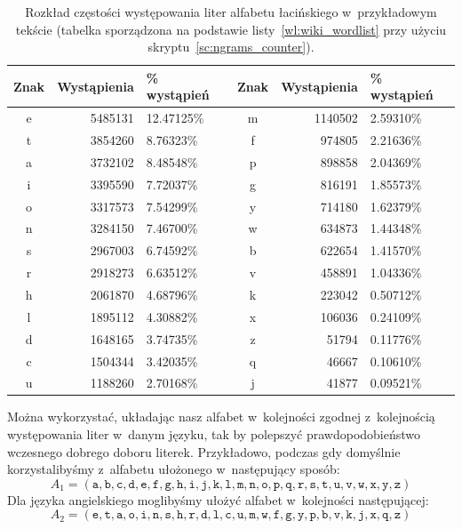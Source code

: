 \documentclass[12pt,a4paper,twoside]{article}
\begin{document}
\begin{table}[htb]
    \caption{Rozkład częstości występowania liter alfabetu łacińskiego
    w~przykładowym tekście (tabelka sporządzona na podstawie
    listy~\ref{wl:wiki_wordlist} przy użyciu skryptu~\ref{sc:ngrams_counter}).}
    \label{tbl:english_letter_frequencies}
    \begin{tabular}{|c|r|l||c|r|l|}
        \hline
        Znak & \small Wystąpienia & \small \% wystąpień &
        Znak & \small Wystąpienia & \small \% wystąpień \\
        \hline
        e & 5485131 & 12.47125\% & m & 1140502 & 2.59310\% \\
        t & 3854260 &  8.76323\% & f &  974805 & 2.21636\% \\
        a & 3732102 &  8.48548\% & p &  898858 & 2.04369\% \\
        i & 3395590 &  7.72037\% & g &  816191 & 1.85573\% \\
        o & 3317573 &  7.54299\% & y &  714180 & 1.62379\% \\
        n & 3284150 &  7.46700\% & w &  634873 & 1.44348\% \\
        s & 2967003 &  6.74592\% & b &  622654 & 1.41570\% \\
        r & 2918273 &  6.63512\% & v &  458891 & 1.04336\% \\
        h & 2061870 &  4.68796\% & k &  223042 & 0.50712\% \\
        l & 1895112 &  4.30882\% & x &  106036 & 0.24109\% \\
        d & 1648165 &  3.74735\% & z &   51794 & 0.11776\% \\
        c & 1504344 &  3.42035\% & q &   46667 & 0.10610\% \\
        u & 1188260 &  2.70168\% & j &   41877 & 0.09521\% \\
        \hline
    \end{tabular}
\end{table}

Można wykorzystać, układając nasz alfabet w~kolejności zgodnej z~kolejnością
występowania liter w~danym języku, tak by polepszyć prawdopodobieństwo
wczesnego dobrego doboru literek. Przykładowo, podczas gdy domyślnie
korzystalibyśmy z~alfabetu ułożonego w~następujący sposób:
    $$A_1 = (
    \mathtt{a}, \mathtt{b}, \mathtt{c}, \mathtt{d}, \mathtt{e}, \mathtt{f},
    \mathtt{g}, \mathtt{h}, \mathtt{i}, \mathtt{j}, \mathtt{k}, \mathtt{l},
    \mathtt{m}, \mathtt{n}, \mathtt{o}, \mathtt{p}, \mathtt{q}, \mathtt{r},
    \mathtt{s}, \mathtt{t}, \mathtt{u}, \mathtt{v}, \mathtt{w}, \mathtt{x},
    \mathtt{y}, \mathtt{z})$$
Dla języka angielskiego moglibyśmy ułożyć alfabet w~kolejności następującej:
    $$A_2 = (
    \mathtt{e}, \mathtt{t}, \mathtt{a}, \mathtt{o}, \mathtt{i}, \mathtt{n},
    \mathtt{s}, \mathtt{h}, \mathtt{r}, \mathtt{d}, \mathtt{l}, \mathtt{c},
    \mathtt{u}, \mathtt{m}, \mathtt{w}, \mathtt{f}, \mathtt{g}, \mathtt{y},
    \mathtt{p}, \mathtt{b}, \mathtt{v}, \mathtt{k}, \mathtt{j}, \mathtt{x},
    \mathtt{q}, \mathtt{z})$$
\end{document}
